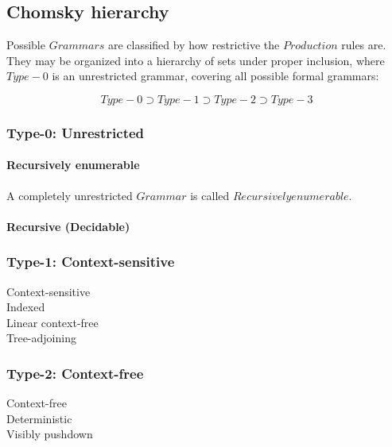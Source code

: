 \documentclass{article}
\begin{document}
\subsection{Chomsky hierarchy}

Possible $Grammars$ are classified by how restrictive the $Production$
rules are. They may be organized into a hierarchy of sets under proper
inclusion, where $Type-0$ is an unrestricted grammar, covering all
possible formal grammars:

\[
    Type-0 \supset Type-1 \supset Type-2 \supset Type-3
\]

\subsubsection{Type-0: Unrestricted}

    \paragraph{Recursively enumerable} A completely unrestricted
    $Grammar$ is called $Recursively enumerable$.

    \paragraph{Recursive (Decidable)}

\subsubsection{Type-1: Context-sensitive}

    \begin{description}

    \item[Context-sensitive]

    \item[Indexed]

    \item[Linear context-free]

    \item[Tree-adjoining]

    \end{description}

\subsubsection{Type-2: Context-free}

    \begin{description}

    \item[Context-free]

    \item[Deterministic]

    \item[Visibly pushdown]

    \end{description}
\end{document}
